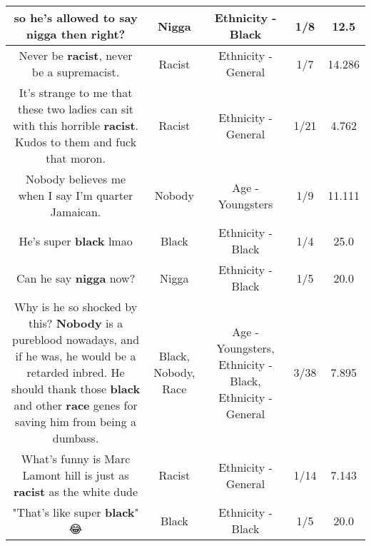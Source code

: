 \documentclass[11pt]{article}
\newlength\mylength
\begin{document}
\begin{center}
\begin{longtable}{|C{.65\mylength}|C{.30\mylength}|C{.12\mylength}|C{.12\mylength}|C{.12\mylength}|}
  \small so he's allowed to say \textbf{nigga} then right?\normalsize   & Nigga & Ethnicity - Black & 1/8 & 12.5 \\  \hline
  \small Never be \textbf{racist}, never be a supremacist.\normalsize   & Racist & Ethnicity - General & 1/7 & 14.286 \\  \hline
  \small It's strange to me that these two ladies can sit with this horrible \textbf{racist}. Kudos to them and fuck that moron.\normalsize   & Racist & Ethnicity - General & 1/21 & 4.762 \\  \hline
  \small Nobody believes me when I say I'm quarter Jamaican.\normalsize   & Nobody & Age - Youngsters & 1/9 & 11.111 \\  \hline
  \small He's super \textbf{black} lmao\normalsize   & Black & Ethnicity - Black & 1/4 & 25.0 \\  \hline
  \small Can he say \textbf{nigga} now?\normalsize   & Nigga & Ethnicity - Black & 1/5 & 20.0 \\  \hline
  \small Why is he so shocked by this? \textbf{Nobody} is a pureblood nowadays, and if he was, he would be a retarded inbred. He should thank those \textbf{black} and other \textbf{race} genes for saving him from being a dumbass.\normalsize   & Black, Nobody, Race & Age - Youngsters, Ethnicity - Black, Ethnicity - General & 3/38 & 7.895 \\  \hline
  \small What's funny is Marc Lamont hill is just as \textbf{racist} as the white dude\normalsize   & Racist & Ethnicity - General & 1/14 & 7.143 \\  \hline
  \small "That's like super \textbf{black}" 😂\normalsize   & Black & Ethnicity - Black & 1/5 & 20.0 \\  \hline

\end{longtable}
\end{center}
\end{document}
